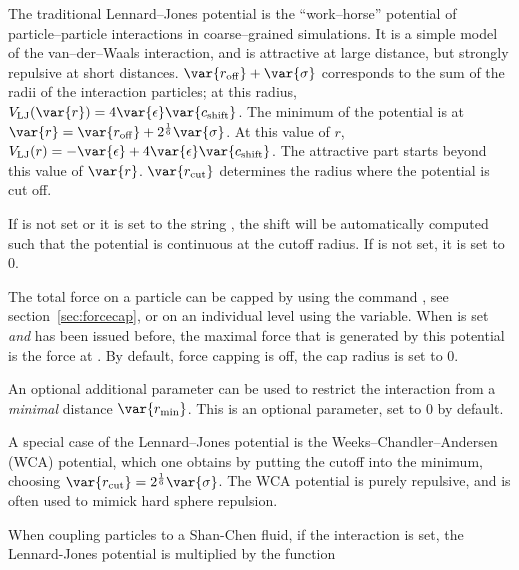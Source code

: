 The traditional Lennard--Jones potential is the ``work--horse''
potential of particle--particle interactions in coarse--grained
simulations.  It is a simple model of the van--der--Waals interaction,
and is attractive at large distance, but strongly repulsive at short
distances.  $\var{r_\mathrm{off}} + \var{\sigma}$ corresponds to the
sum of the radii of the interaction particles; at this radius,
$V_\mathrm{LJ}(\var{r}) = 4 \var{\epsilon} \var{c_\mathrm{shift}}$.
The minimum of the potential is at $\var{r} = \var{r_\mathrm{off}} +
2^\frac{1}{6}\var{\sigma}$.  At this value of $r$, $V_\mathrm{LJ}(r) =
-\var{\epsilon} + 4 \var{\epsilon} \var{c_\mathrm{shift}}$. The
attractive part starts beyond this value of $\var{r}$.
$\var{r_\mathrm{cut}}$ determines the radius where the potential is
cut off. 

If  is not set or it is set to the string
, the shift will be automatically computed such that the
potential is continuous at the cutoff radius. If 
is not set, it is set to $0$.

The total force on a particle can be capped by using the command
, see section~\ref{sec:forcecap}, or on an
individual level using the  variable. When
 is set \emph{and}  has been issued before, the maximal force that is generated by
this potential is the force at .  By default,
force capping is off, \ie the cap radius is set to 0.

An optional additional parameter can be used to restrict the
interaction from a \emph{minimal} distance
$\var{r_\mathrm{min}}$. This is an optional parameter, set to 0 by
default.

A special case of the Lennard--Jones potential is the
Weeks--Chandler--Andersen (WCA) potential, which one obtains by
putting the cutoff into the minimum, \ie choosing
$\var{r_\mathrm{cut}}=2^\frac{1}{6}\var{\sigma}$. The WCA potential is
purely repulsive, and is often used to mimick hard sphere repulsion.


When coupling particles to a Shan-Chen fluid, if the  interaction is set, the Lennard-Jones potential is multiplied by the function 

